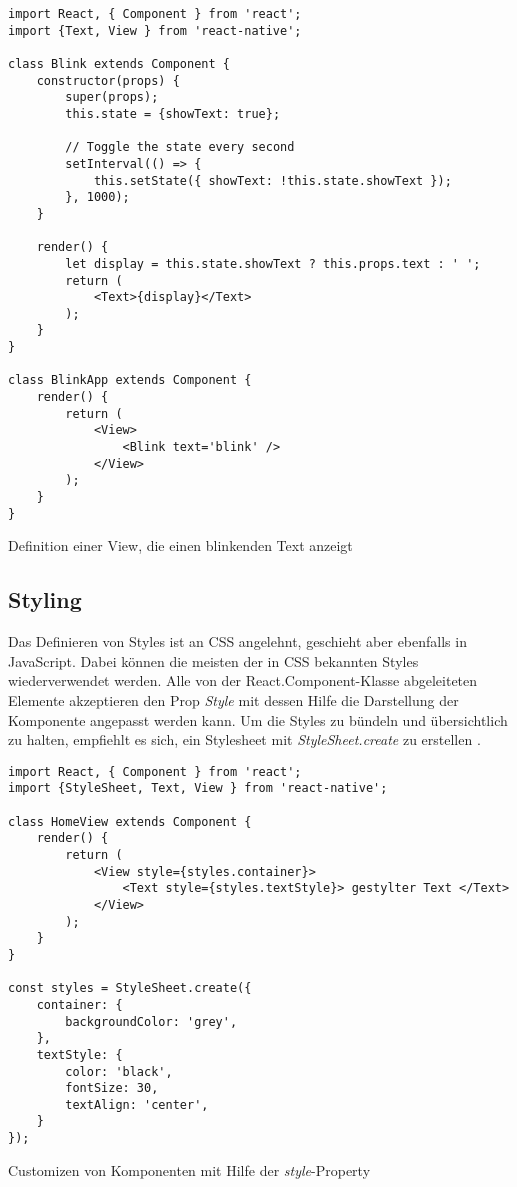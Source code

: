 \begin{listing}[H]
    \begin{verbatim}
import React, { Component } from 'react';
import {Text, View } from 'react-native';

class Blink extends Component {
    constructor(props) {
        super(props);
        this.state = {showText: true};

        // Toggle the state every second
        setInterval(() => {
            this.setState({ showText: !this.state.showText });
        }, 1000);
    }

    render() {
        let display = this.state.showText ? this.props.text : ' ';
        return (
            <Text>{display}</Text>
        );
    }
}

class BlinkApp extends Component {
    render() {
        return (
            <View>
                <Blink text='blink' />
            </View>
        );
    }
}

    \end{verbatim}
    \caption{Definition einer View, die einen blinkenden Text anzeigt \cite{facebook_inc._state_2017}}
    \label{lst:state}
\end{listing}


\subsection{Styling}
Das Definieren von Styles ist an CSS angelehnt, geschieht aber ebenfalls in JavaScript. Dabei können die meisten der in CSS bekannten Styles wiederverwendet werden. Alle von der React.Component-Klasse abgeleiteten Elemente akzeptieren den Prop \textit{Style} \cite{facebook_inc._style_2017} mit dessen Hilfe die Darstellung der Komponente angepasst werden kann. Um die Styles zu bündeln und übersichtlich zu halten, empfiehlt es sich, ein Stylesheet mit \textit{StyleSheet.create} zu erstellen \cite{facebook_inc._style_2017}. 

\begin{listing}[H]
    \begin{verbatim}
import React, { Component } from 'react';
import {StyleSheet, Text, View } from 'react-native';

class HomeView extends Component {
    render() {
        return (
            <View style={styles.container}>
                <Text style={styles.textStyle}> gestylter Text </Text>
            </View>
        );
    }
}

const styles = StyleSheet.create({
    container: {
        backgroundColor: 'grey',
    },
    textStyle: {
        color: 'black',
        fontSize: 30,
        textAlign: 'center',
    }
});    
    \end{verbatim}
    \caption{Customizen von Komponenten mit Hilfe der \textit{style}-Property}
    \label{lst:style}
\end{listing}

